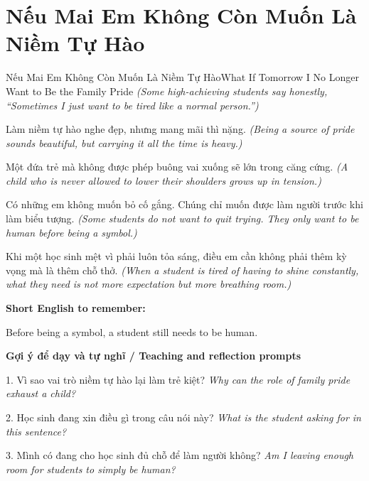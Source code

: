 \section{Nếu Mai Em Không Còn Muốn Là Niềm Tự Hào}
\begin{truyen}{Nếu Mai Em Không Còn Muốn Là Niềm Tự Hào}{What If Tomorrow I No Longer Want to Be the Family Pride}
\textit{(Some high-achieving students say honestly, “Sometimes I just want to be tired like a normal person.”)}

Làm niềm tự hào nghe đẹp, nhưng mang mãi thì nặng.
\textit{(Being a source of pride sounds beautiful, but carrying it all the time is heavy.)}

Một đứa trẻ mà không được phép buông vai xuống sẽ lớn trong căng cứng.
\textit{(A child who is never allowed to lower their shoulders grows up in tension.)}

Có những em không muốn bỏ cố gắng. Chúng chỉ muốn được làm người trước khi làm biểu tượng.
\textit{(Some students do not want to quit trying. They only want to be human before being a symbol.)}

\end{truyen}

\begin{baihoc}
Khi một học sinh mệt vì phải luôn tỏa sáng, điều em cần không phải thêm kỳ vọng mà là thêm chỗ thở.
\textit{(When a student is tired of having to shine constantly, what they need is not more expectation but more breathing room.)}
\end{baihoc}

\begin{ghinhoanh}
\textbf{Short English to remember:}

Before being a symbol, a student still needs to be human.

\end{ghinhoanh}

\begin{tuhocnhanh}
\textbf{Gợi ý để dạy và tự nghĩ / Teaching and reflection prompts}

1. Vì sao vai trò niềm tự hào lại làm trẻ kiệt? \textit{Why can the role of family pride exhaust a child?}

2. Học sinh đang xin điều gì trong câu nói này? \textit{What is the student asking for in this sentence?}

3. Mình có đang cho học sinh đủ chỗ để làm người không? \textit{Am I leaving enough room for students to simply be human?}
\end{tuhocnhanh}
